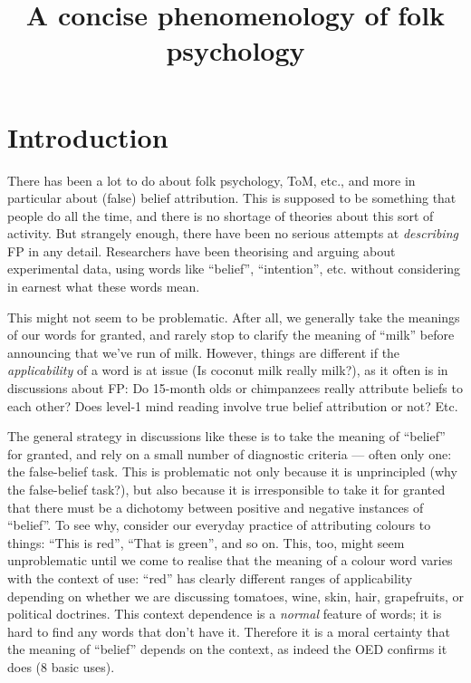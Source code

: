 \documentclass[12pt,a4paper]{article}
\title{A concise phenomenology of folk psychology}
\newcommand{\E}[1]{\emph{#1}}
\newcommand{\Q}[1]{``#1''}
\begin{document}


\maketitle


\section{Introduction}
There has been a lot to do about folk psychology, ToM, etc., and more in particular about (false) belief attribution. This is supposed to be something that people do all the time, and there is no shortage of theories about this sort of activity. But strangely enough, there have been no serious attempts at \E{describing} FP in any detail. Researchers have been theorising and arguing about experimental data, using words like \Q{belief}, \Q{intention}, etc. without considering in earnest what these words mean.

This might not seem to be problematic. After all, we generally take the meanings of our words for granted, and rarely stop to clarify the meaning of \Q{milk} before announcing that we've run of milk. However, things are different if the \E{applicability} of a word is at issue (Is coconut milk really milk?), as it often is in discussions about FP: Do 15-month olds or chimpanzees really attribute beliefs to each other? Does level-1 mind reading involve true belief attribution or not? Etc. 

The general strategy in discussions like these is to take the meaning of \Q{belief} for granted, and rely on a small number of diagnostic criteria --- often only one: the false-belief task. This is problematic not only because it is unprincipled (why the false-belief task?), but also because it is irresponsible to take it for granted that there must be a dichotomy between positive and negative instances of \Q{belief}. To see why, consider our everyday practice of attributing colours to things: \Q{This is red}, \Q{That is green}, and so on. This, too, might seem unproblematic until we come to realise that the meaning of a colour word varies with the context of use: \Q{red} has clearly different ranges of applicability depending on whether we are discussing tomatoes, wine, skin, hair, grapefruits, or political doctrines. This context dependence is a \E{normal} feature of words; it is hard to find any words that don't have it. Therefore it is a moral certainty that the meaning of \Q{belief} depends on the context, as indeed the OED confirms  it does (8 basic uses).
\end{document}
